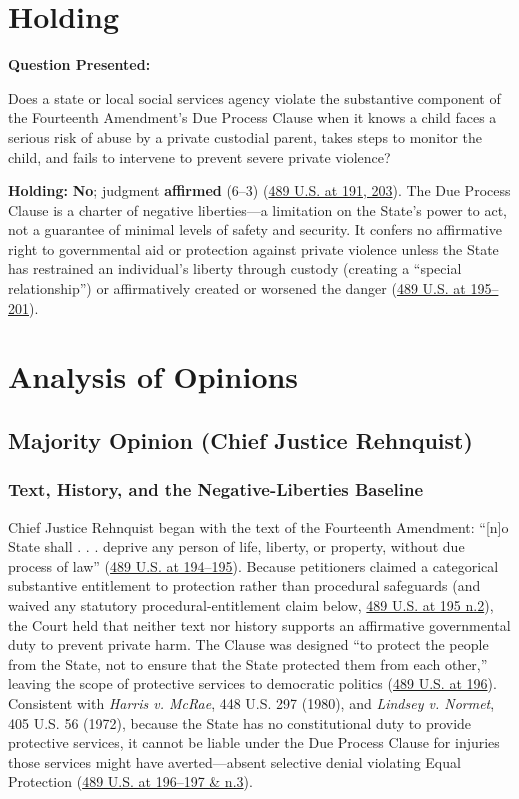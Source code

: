 \documentclass[12pt]{article}
\begin{document}
\section{Holding}
\textbf{Question Presented:}

Does a state or local social services agency violate the substantive component of the Fourteenth Amendment's Due Process Clause when it knows a child faces a serious risk of abuse by a private custodial parent, takes steps to monitor the child, and fails to intervene to prevent severe private violence?

\textbf{Holding:} \textbf{No}; judgment \textbf{affirmed} (6--3) (\href{https://supreme.justia.com/cases/federal/us/489/189/}{489 U.S. at 191, 203}). The Due Process Clause is a charter of negative liberties---a limitation on the State's power to act, not a guarantee of minimal levels of safety and security. It confers no affirmative right to governmental aid or protection against private violence unless the State has restrained an individual's liberty through custody (creating a ``special relationship'') or affirmatively created or worsened the danger (\href{https://supreme.justia.com/cases/federal/us/489/189/}{489 U.S. at 195--201}).

\section{Analysis of Opinions}
\subsection{Majority Opinion (Chief Justice Rehnquist)}

\subsubsection{Text, History, and the Negative-Liberties Baseline}

Chief Justice Rehnquist began with the text of the Fourteenth Amendment: ``[n]o State shall . . . deprive any person of life, liberty, or property, without due process of law'' (\href{https://supreme.justia.com/cases/federal/us/489/189/}{489 U.S. at 194--195}). Because petitioners claimed a categorical substantive entitlement to protection rather than procedural safeguards (and waived any statutory procedural-entitlement claim below, \href{https://supreme.justia.com/cases/federal/us/489/189/}{489 U.S. at 195 n.2}), the Court held that neither text nor history supports an affirmative governmental duty to prevent private harm. The Clause was designed ``to protect the people from the State, not to ensure that the State protected them from each other,'' leaving the scope of protective services to democratic politics (\href{https://supreme.justia.com/cases/federal/us/489/189/}{489 U.S. at 196}). Consistent with \textit{Harris v. McRae}, 448 U.S. 297 (1980), and \textit{Lindsey v. Normet}, 405 U.S. 56 (1972), because the State has no constitutional duty to provide protective services, it cannot be liable under the Due Process Clause for injuries those services might have averted---absent selective denial violating Equal Protection (\href{https://supreme.justia.com/cases/federal/us/489/189/}{489 U.S. at 196--197 \& n.3}).
\end{document}
